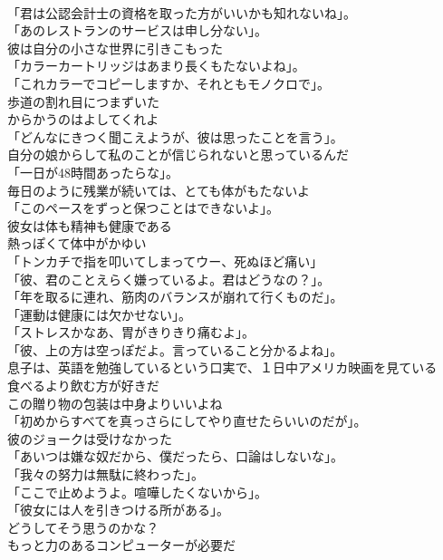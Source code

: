 \documentclass[8pt]{extreport}
\begin{document}
\begin{CJK}{UTF8}{min}
\\	「君は公認会計士の資格を取った方がいいかも知れないね」。	
\\	「あのレストランのサービスは申し分ない」。	
\\	彼は自分の小さな世界に引きこもった	
\\	「カラーカートリッジはあまり長くもたないよね」。	
\\	「これカラーでコピーしますか、それともモノクロで」。	
\\	歩道の割れ目につまずいた	
\\	からかうのはよしてくれよ	
\\	「どんなにきつく聞こえようが、彼は思ったことを言う」。	
\\	自分の娘からして私のことが信じられないと思っているんだ	
\\	「一日が48時間あったらな」。	
\\	毎日のように残業が続いては、とても体がもたないよ	
\\	「このペースをずっと保つことはできないよ」。	
\\	彼女は体も精神も健康である	
\\	熱っぽくて体中がかゆい	
\\	「トンカチで指を叩いてしまってウー、死ぬほど痛い」	
\\	「彼、君のことえらく嫌っているよ。君はどうなの？」。	
\\	「年を取るに連れ、筋肉のバランスが崩れて行くものだ」。	
\\	「運動は健康には欠かせない」。	
\\	「ストレスかなあ、胃がきりきり痛むよ」。	
\\	「彼、上の方は空っぽだよ。言っていること分かるよね」。	
\\	息子は、英語を勉強しているという口実で、１日中アメリカ映画を見ている	
\\	食べるより飲む方が好きだ	
\\	この贈り物の包装は中身よりいいよね	
\\	「初めからすべてを真っさらにしてやり直せたらいいのだが」。	
\\	彼のジョークは受けなかった	
\\	「あいつは嫌な奴だから、僕だったら、口論はしないな」。	
\\	「我々の努力は無駄に終わった」。	
\\	「ここで止めようよ。喧嘩したくないから」。	
\\	「彼女には人を引きつける所がある」。	
\\	どうしてそう思うのかな？	
\\	もっと力のあるコンピューターが必要だ	

\end{CJK}
\end{document}

